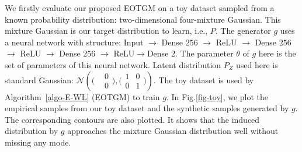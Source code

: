 {We firstly evaluate our proposed EOTGM on a toy dataset sampled from a known probability
  distribution: two-dimensional four-mixture Gaussian. This mixture Gaussian is our target distribution to learn, i.e., $P$. The generator $g$ uses a neural network with structure: Input $\rightarrow$ Dense $256$ $\rightarrow$ ReLU $\rightarrow$ Dense $256$ $\rightarrow$ ReLU $\rightarrow$ Dense $256$ $\rightarrow$ ReLU$\rightarrow$Dense $2$. The parameter $\theta$ of $g$ here is the set of parameters of this neural network. Latent distribution $P_Z$ used here is standard Gaussian: $\mathcal{N}\left(\bigl(\begin{smallmatrix}& 0\\
    &0\end{smallmatrix}\bigr) ,\bigl( \begin{smallmatrix}1 & 0\\ 0 &
    1\end{smallmatrix}  \bigr)\right)$.
The toy dataset is used by Algorithm~\autoref{algo-E-WL} (EOTGM) to train $g$. In Fig.\ref{fig-toy}, we plot the empirical samples from our toy dataset and the synthetic samples generated by $g$. The corresponding contours are also plotted. It shows that the induced distribution by $g$ approaches the mixture Gaussian distribution well without missing any mode.}          
